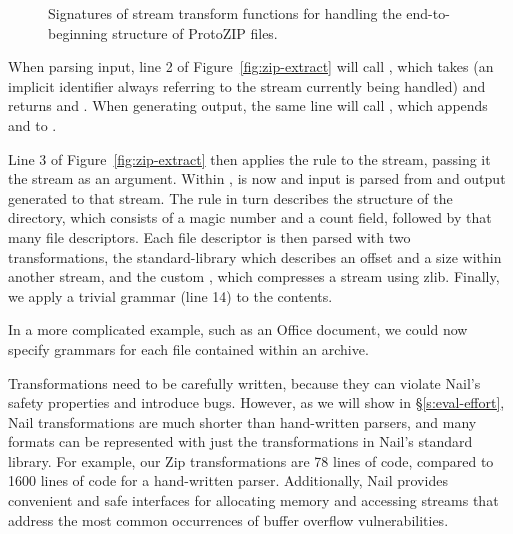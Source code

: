 \begin{figure}[tb]
\smaller[0.5]

\caption{Signatures of stream transform functions for handling the
end-to-beginning structure of ProtoZIP files.}
\label{fig:zip-transform}
\end{figure}
When parsing input, line 2 of Figure~\ref{fig:zip-extract} will call , which takes  (an implicit
identifier always referring to the stream currently being handled) and returns  and
. When generating output, the same line will call , which appends
 and  to .

Line 3 of Figure~\ref{fig:zip-extract} then applies the  rule to  the  stream, passing it the 
stream as an argument. Within ,  is now  and input is parsed from and output
generated to that stream. The  rule in turn describes the structure of the directory, which consists of a
magic number and a count field, followed by that many file descriptors. Each file descriptor is then parsed with two
transformations, the standard-library  which describes an offset and a size within another
stream, and the custom , which compresses a stream using zlib. Finally, we apply a trivial
grammar (line 14) to the contents. 

In a more complicated example, such as an Office document, we could now specify grammars for each
file contained within an archive.


 

Transformations need to be carefully written, because they can violate Nail's safety properties
and introduce
bugs. However, as we will show in \S\ref{s:eval-effort}, Nail transformations are much shorter than
hand-written parsers, and many formats can be represented with just the transformations in Nail's
standard library.
For example, our Zip transformations are 78 lines of code, compared to 1600 lines of code for a
   hand-written parser. Additionally, Nail provides convenient and safe interfaces for allocating
   memory and accessing streams that address the most common occurrences of buffer overflow
   vulnerabilities.  


